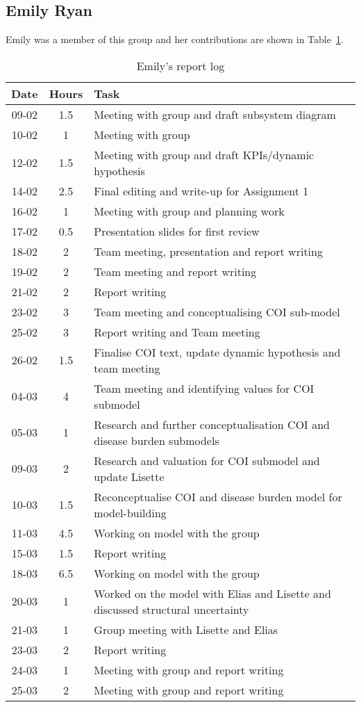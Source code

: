 
\subsection{Emily Ryan}
Emily was a member of this group and her contributions are shown in Table~\ref{tab:emily_log}. 
\begin{longtable}[c]{c|c|m{35em}}
\caption{Emily's report log}
\label{tab:emily_log}\\
\textbf{Date}& \textbf{Hours} & \textbf{Task} \\
\hline
\endfirsthead
%
\endhead
%
 09-02  &   1.5    & Meeting with group and draft subsystem diagram  \\
 10-02  &    1   & Meeting with group  \\
 12-02  &    1.5   & Meeting with group and draft KPIs/dynamic hypothesis  \\
 14-02  & 2.5  & Final editing and write-up for Assignment 1\\
 16-02 & 1 & Meeting with group and planning work\\
 17-02 & 0.5 & Presentation slides for first review\\
 18-02 & 2 & Team meeting, presentation and report writing\\
 19-02 & 2 & Team meeting and report writing\\
 21-02 & 2 & Report writing\\
 23-02 & 3 & Team meeting and conceptualising COI sub-model\\
 25-02 & 3 & Report writing and Team meeting\\
 26-02 & 1.5 & Finalise COI text, update dynamic hypothesis and team meeting\\
 04-03 & 4 & Team meeting and identifying values for COI submodel\\
 05-03 & 1 & Research and further conceptualisation COI and disease burden submodels\\
 09-03 & 2 & Research and valuation for COI submodel and update Lisette\\
 10-03 & 1.5 & Reconceptualise COI and disease burden model for model-building \\
 11-03 &  4.5 & Working on model with the group \\
 15-03 & 1.5 & Report writing \\
 18-03 & 6.5  & Working on model with the group \\
 20-03 & 1 & Worked on the model with Elias and Lisette and discussed structural uncertainty \\
 21-03 & 1 & Group meeting with Lisette and Elias\\
 23-03 & 2 & Report writing\\
 24-03 & 1 & Meeting with group and report writing\\
 25-03 & 2 & Meeting with group and report writing\\

\end{longtable}

